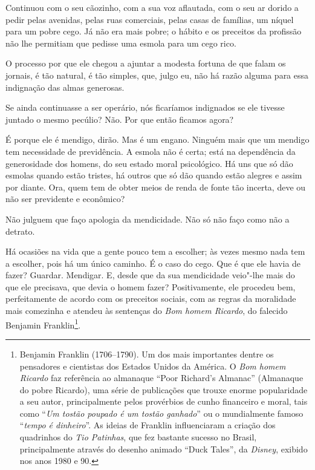 Continuou com o seu cãozinho, com a sua voz aflautada, com o seu ar
dorido a pedir pelas avenidas, pelas ruas comerciais, pelas casas de
famílias, um níquel para um pobre cego. Já não era mais pobre; o hábito
e os preceitos da profissão não lhe permitiam que pedisse uma esmola
para um cego rico.

O processo por que ele chegou a ajuntar a modesta fortuna de que falam
os jornais, é tão natural, é tão simples, que, julgo eu, não há razão
alguma para essa indignação das almas generosas.

Se ainda continuasse a ser operário, nós ficaríamos indignados se ele
tivesse juntado o mesmo pecúlio? Não. Por que então ficamos agora?

É porque ele é mendigo, dirão. Mas é um engano. Ninguém mais que um
mendigo tem necessidade de previdência. A esmola não é certa; está na
dependência da generosidade dos homens, do seu estado moral psicológico.
Há uns que só dão esmolas quando estão tristes, há outros que só dão
quando estão alegres e assim por diante. Ora, quem tem de obter meios de
renda de fonte tão incerta, deve ou não ser previdente e econômico?

Não julguem que faço apologia da mendicidade. Não só não faço como não a
detrato.

Há ocasiões na vida que a gente pouco tem a escolher; às vezes mesmo
nada tem a escolher, pois há um único caminho. É o caso do cego. Que é
que ele havia de fazer? Guardar. Mendigar. E, desde que da sua
mendicidade veio"-lhe mais do que ele precisava, que devia o homem fazer?
Positivamente, ele procedeu bem, perfeitamente de acordo com os
preceitos sociais, com as regras da moralidade mais comezinha e atendeu
às sentenças do \emph{Bom homem Ricardo}, do falecido Benjamin
Franklin\footnote{Benjamin Franklin (1706--1790). Um dos mais
  importantes dentre os pensadores e cientistas dos Estados Unidos da
  América. O \emph{Bom homem Ricardo} faz referência ao almanaque ``Poor
  Richard's Almanac'' (Almanaque do pobre Ricardo), uma série de
  publicações que trouxe enorme popularidade a seu autor, principalmente
  pelos provérbios de cunho financeiro e moral, tais como ``\emph{Um
  tostão poupado é um tostão ganhado}'' ou o mundialmente famoso
  ``\emph{tempo é dinheiro}''. As ideias de Franklin influenciaram a
  criação dos quadrinhos do \emph{Tio Patinhas}, que fez bastante
  sucesso no Brasil, principalmente através do desenho animado ``Duck
  Tales'', da \emph{Disney}, exibido nos anos 1980 e 90.}.

